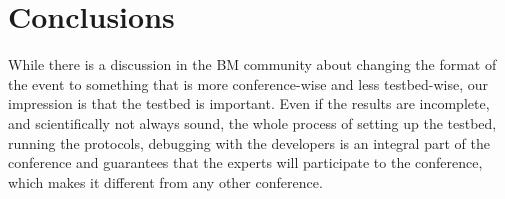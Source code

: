 \documentclass[10pt,onecolumn]{paper}
\begin{document}
\section{Conclusions}
While there is a discussion in the BM community about changing the format of the event
to something that is more conference-wise and less testbed-wise, our
impression is that the testbed is important. Even if the results are
incomplete, and scientifically not always sound, the whole process of
setting up the testbed, running the protocols, debugging with the developers
is an integral part of the conference and guarantees that the experts will
participate to the conference, which makes it different from any other
conference. 



%
%
\end{document}
